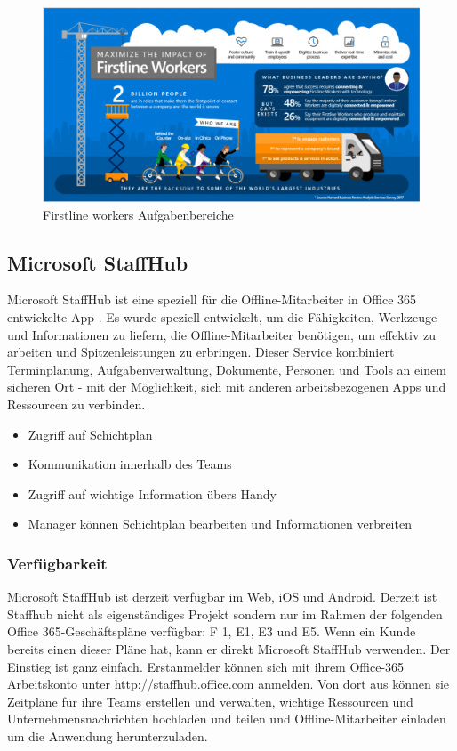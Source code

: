 \begin{figure}[H] 
\centering 
\includegraphics[scale=0.48]{images/frontlineworkers} 
\caption[Frontline Workers]{Firstline workers Aufgabenbereiche\protect} 
\label{dem} 
\end{figure}


\subsection{Microsoft StaffHub}

Microsoft StaffHub ist eine speziell für die Offline-Mitarbeiter in Office 365 entwickelte App . Es wurde speziell entwickelt, um die Fähigkeiten, Werkzeuge und Informationen zu liefern, die Offline-Mitarbeiter benötigen, um effektiv zu arbeiten und Spitzenleistungen zu erbringen. Dieser Service kombiniert Terminplanung, Aufgabenverwaltung, Dokumente, Personen und Tools an einem sicheren Ort - mit der Möglichkeit, sich mit anderen arbeitsbezogenen Apps und Ressourcen zu verbinden.

\begin{itemize}
\item Zugriff auf Schichtplan
\item Kommunikation innerhalb des Teams
\item Zugriff auf wichtige Information übers Handy
\item Manager können Schichtplan bearbeiten und Informationen verbreiten
\end{itemize}

\subsubsection{Verfügbarkeit}
Microsoft StaffHub ist derzeit verfügbar im Web, iOS und Android. Derzeit ist Staffhub nicht als eigenständiges Projekt sondern nur im Rahmen der folgenden Office 365-Geschäftspläne verfügbar: F 1, E1, E3 und E5. Wenn ein Kunde bereits einen dieser Pläne hat, kann er direkt Microsoft StaffHub verwenden. Der Einstieg ist ganz einfach. Erstanmelder können sich mit ihrem Office-365 Arbeitskonto unter http://staffhub.office.com anmelden. Von dort aus können sie Zeitpläne für ihre Teams erstellen und verwalten, wichtige Ressourcen und Unternehmensnachrichten hochladen und teilen und Offline-Mitarbeiter einladen um die Anwendung herunterzuladen.

